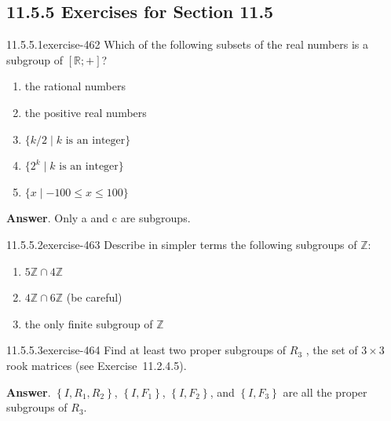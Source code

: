\documentclass[twoside,10pt,]{book}
\numberwithin{equation}{section}
\begin{document}
\subsection*{11.5.5 Exercises for Section 11.5}
\begin{divisionsolution}{11.5.5.1}{}{exercise-462}%
\hypertarget{p-4113}{}%
Which of the following subsets of the real numbers is a subgroup of \([\mathbb{R}; +]\)?\leavevmode%
\begin{enumerate}[label=(\alph*)]
\item\hypertarget{li-1866}{}\hypertarget{p-4114}{}%
the rational numbers%
\item\hypertarget{li-1867}{}\hypertarget{p-4115}{}%
the positive real numbers%
\item\hypertarget{li-1868}{}\hypertarget{p-4116}{}%
\(\{k/2 \mid k \textrm{ is} \textrm{ an} \textrm{ integer}\}\)%
\item\hypertarget{li-1869}{}\hypertarget{p-4117}{}%
\(\{2^k  \mid k \textrm{ is an  integer}\}\)%
\item\hypertarget{li-1870}{}\hypertarget{p-4118}{}%
\(\{x \mid -100 \leq x \leq  100\}\)%
\end{enumerate}
%
\par\smallskip%
\noindent\textbf{Answer}.\quad%
\hypertarget{p-4119}{}%
Only  a and c are subgroups.%
\end{divisionsolution}%
\begin{divisionsolution}{11.5.5.2}{}{exercise-463}%
\hypertarget{p-4120}{}%
Describe in simpler terms the following subgroups of \(\mathbb{Z}\):\leavevmode%
\begin{enumerate}[label=(\alph*)]
\item\hypertarget{li-1871}{}\hypertarget{p-4121}{}%
\(5\mathbb{Z} \cap  4\mathbb{Z}\)%
\item\hypertarget{li-1872}{}\hypertarget{p-4122}{}%
\(4\mathbb{Z} \cap  6\mathbb{Z}\) (be careful)%
\item\hypertarget{li-1873}{}\hypertarget{p-4123}{}%
the only finite subgroup of \(\mathbb{Z}\)%
\end{enumerate}
%
\end{divisionsolution}%
\begin{divisionsolution}{11.5.5.3}{}{exercise-464}%
\hypertarget{p-4124}{}%
Find at least two proper subgroups of \(R_3\) , the set of \(3\times 3\) rook matrices (see Exercise~11.2.4.5).%
\par\smallskip%
\noindent\textbf{Answer}.\quad%
\hypertarget{p-4125}{}%
\(\left\{I,R_1,R_2\right\}\), \(\left\{I,F_1\right\}\), \(\left\{I,F_2\right\}\), and \(\left\{I,F_3\right\}\) are all the proper subgroups of \(R_3\).%
\end{divisionsolution}%
\end{document}
